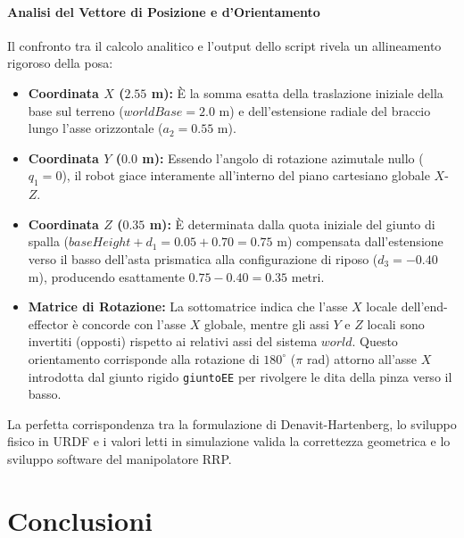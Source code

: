 \documentclass[11pt, a4paper]{report}
\begin{document}
\subsubsection{Analisi del Vettore di Posizione e d'Orientamento}

Il confronto tra il calcolo analitico e l'output dello script rivela un allineamento rigoroso della posa:
\begin{itemize}
    \item \textbf{Coordinata $X$ ($2.55$ m):} È la somma esatta della traslazione iniziale della base sul terreno (\(worldBase = 2.0\) m) e dell'estensione radiale del braccio lungo l'asse orizzontale (\(a_2 = 0.55\) m).

    \item \textbf{Coordinata $Y$ ($0.0$ m):} Essendo l'angolo di rotazione azimutale nullo (\(q_1 = 0\)), il robot giace interamente all'interno del piano cartesiano globale $X$-$Z$.

    \item \textbf{Coordinata $Z$ ($0.35$ m):} È determinata dalla quota iniziale del giunto di spalla (\(baseHeight + d_1 = 0.05 + 0.70 = 0.75\) m) compensata dall'estensione verso il basso dell'asta prismatica alla configurazione di riposo (\(d_3 = -0.40\) m), producendo esattamente \(0.75 - 0.40 = 0.35\) metri.

    \item \textbf{Matrice di Rotazione:} La sottomatrice indica che l'asse $X$ locale dell'end-effector è concorde con l'asse $X$ globale, mentre gli assi $Y$ e $Z$ locali sono invertiti (opposti) rispetto ai relativi assi del sistema $world$. Questo orientamento corrisponde alla rotazione di $180^\circ$ (\(\pi\) rad) attorno all'asse $X$ introdotta dal giunto rigido \texttt{giuntoEE} per rivolgere le dita della pinza verso il basso.
\end{itemize}

La perfetta corrispondenza tra la formulazione di Denavit-Hartenberg, lo sviluppo fisico in URDF e i valori letti in simulazione valida la correttezza geometrica e lo sviluppo software del manipolatore RRP.



\chapter{Conclusioni}
\label{chap:conclusioni}
\end{document}
